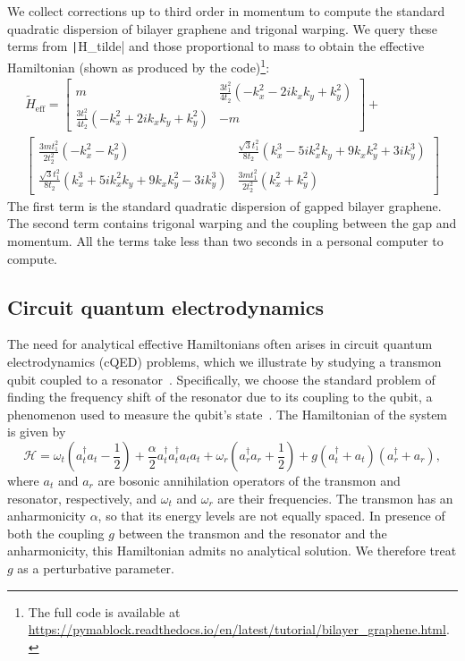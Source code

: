 We collect corrections up to third order in momentum to compute the standard quadratic dispersion of bilayer graphene and trigonal warping.
We query these terms from \texttt|H_tilde| and those proportional to mass to obtain the effective Hamiltonian (shown as produced by the code)\footnote{The full code is available at \url{https://pymablock.readthedocs.io/en/latest/tutorial/bilayer_graphene.html}.}:
%
{\small
\begin{gather}
\tilde{H}_{\textrm{eff}} =
\begin{bmatrix}
m & \frac{3 t_1^2}{4 t_2} ( - k_x^2 - 2ik_x k_y + k_y^2) \\
\frac{3 t_1^2}{4 t_2} ( - k_x^2 + 2ik_x k_y + k_y^2) & -m
\end{bmatrix} + \nonumber \\
\begin{bmatrix}
\frac{3 m t_1^2}{2 t_2^2} ( - k_x^2 - k_y^2) & \frac{\sqrt{3} t_1^2}{8 t_2} (k_x^3 - 5ik_x^2 k_y + 9 k_x k_y^2 + 3ik_y^3) \\
\frac{\sqrt{3} t_1^2}{8 t_2} (k_x^3 + 5ik_x^2 k_y + 9 k_x k_y^2 - 3ik_y^3) & \frac{3 m t_1^2}{2 t_2^2} (k_x^2 + k_y^2)
\end{bmatrix} \nonumber
\end{gather}
}
%
The first term is the standard quadratic dispersion of gapped bilayer graphene.
The second term contains trigonal warping and the coupling between the gap and momentum.
All the terms take less than two seconds in a personal computer to compute.

\subsection{Circuit quantum electrodynamics}
\label{sec:cqed}

The need for analytical effective Hamiltonians often arises in circuit quantum electrodynamics (cQED) problems, which we illustrate by studying a transmon qubit coupled to a resonator~\cite{Krantz_2019}.
Specifically, we choose the standard problem of finding the frequency shift of the resonator due to its coupling to the qubit, a phenomenon used to measure the qubit's state~\cite{Blais_2004}.
The Hamiltonian of the system is given by
%
\begin{equation}
    \label{eq:H_cqed}
    \mathcal{H} =
    \omega_t (a^{\dagger}_{t} a_{t} - \frac{1}{2})
    + \frac{\alpha}{2} a^{\dagger}_{t} a^{\dagger}_{t} a_{t} a_{t} +
    \omega_r (a^{\dagger}_{r} a_{r} + \frac{1}{2}) +
    g (a^{\dagger}_{t} + a_{t}) (a^{\dagger}_{r} + a_{r}),
\end{equation}
%
where $a_t$ and $a_r$ are bosonic annihilation operators of the transmon and resonator, respectively, and $\omega_t$ and $\omega_r$ are their frequencies.
The transmon has an anharmonicity $\alpha$, so that its energy levels are not equally spaced.
In presence of both the coupling $g$ between the transmon and the resonator and the anharmonicity, this Hamiltonian admits no analytical solution.
We therefore treat $g$ as a perturbative parameter.

